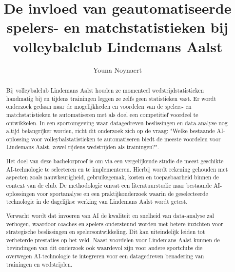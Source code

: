 \documentclass{hogent-article}
\title{De invloed van geautomatiseerde spelers- en matchstatistieken bij volleybalclub Lindemans Aalst}
\author{Youna Noynaert}
\begin{document}
\begin{abstract}
  Bij volleybalclub Lindemans Aalst houden ze momenteel wedstrijdstatistieken handmatig bij en tijdens trainingen leggen ze zelfs geen statistieken vast. Er wordt onderzoek gedaan naar de mogelijkheden en voordelen van de spelers- en matchstatistieken te automatiseren met als doel een competitief voordeel te ontwikkelen. In een sportomgeving waar datagedreven beslissingen en data-analyse nog altijd belangrijker worden, richt dit onderzoek zich op de vraag: "Welke bestaande AI-oplossing voor volleybalstatistieken te automatiseren biedt de meeste voordelen voor Lindemans Aalst, zowel tijdens wedstrijden als trainingen?".
  
  Het doel van deze bachelorproef is om via een vergelijkende studie de meest geschikte AI-technologie te selecteren en te implementeren. Hierbij wordt rekening gehouden met aspecten zoals nauwkeurigheid, gebruiksgemak, kosten en toepasbaarheid binnen de context van de club. De methodologie omvat een literatuurstudie naar bestaande AI-oplossingen voor sportanalyse en een praktijkonderzoek waarin de geselecteerde technologie in de dagelijkse werking van Lindemans Aalst wordt getest.
  
  Verwacht wordt dat invoeren van AI de kwaliteit en snelheid van data-analyse zal verhogen, waardoor coaches en spelers ondersteund worden met betere inzichten voor strategische beslissingen en spelersontwikkeling. Dit kan uiteindelijk leiden tot verbeterde prestaties op het veld. Naast voordelen voor Lindemans Aalst kunnen de bevindingen van dit onderzoek ook waardevol zijn voor andere sportclubs die overwegen AI-technologie te integreren voor een datagedreven benadering van trainingen en wedstrijden. 
\end{abstract}

\tableofcontents

\listoffigures



\printbibliography[heading=bibintoc]
\end{document}
